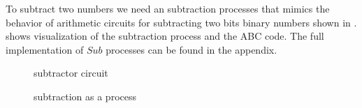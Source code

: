 To subtract two numbers we need an subtraction processes that mimics the behavior of arithmetic circuits for subtracting two bits binary numbers shown in 
.
 shows visualization of the subtraction process and the ABC code.
The full implementation of $Sub$ processes can be found in the appendix.
\begin{figure}[H]%
\centering
{}
\caption{subtractor circuit}
\label{tra_subtract_circuit}%
\end{figure}


\begin{figure}[H]%
\centering
{}%
\hspace{\fill}
%
\hspace{1em}%
%
\caption{subtraction as a process}
\label{tra_subttraction}%
\end{figure}
